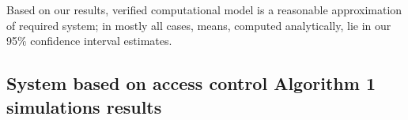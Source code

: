 \documentclass[10pt,a4paper]{article}
\begin{document}
Based on our results, verified computational model is a reasonable approximation of required system; in mostly all cases, 
means, computed analytically, lie in our 95\% confidence interval estimates. 

\subsection{System based on access control Algorithm 1 simulations results}

\newpage
{}

\begin{figure}[h!]
    \centering
    

\end{figure}
\end{document}
